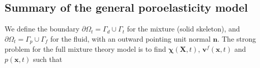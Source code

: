 \subsection{Summary of the general poroelasticity model}
We define the boundary $\partial\Omega_{t} = \Gamma_{d}  \cup \Gamma_{t} $ for the mixture (solid skeleton), and $\partial\Omega_{t} = \Gamma_{p}  \cup \Gamma_{f} $ for the fluid, with an outward pointing unit normal $\boldsymbol{n}$. The strong problem for the full mixture theory model is to find $\boldsymbol{\chi}(\boldsymbol{X},t)$,  $\boldsymbol{v}^{f}(\boldsymbol{x},t)$ and $p(\boldsymbol{x},t)$ such that
\begin{comment}
\begin{subequations}
\begin{align}
\hat\rho^{s} \boldsymbol{a}^{s}+\hat \rho^{f} \boldsymbol{a}^{f} = \nabla \cdot( \boldsymbol{\sigma}_{e}+\boldsymbol{\sigma}_{vis}-p\boldsymbol{I}) + \rho\boldsymbol{f} \;\;\; \mbox{in} \; \Omega_{t},\\
\hat\rho^{f}\boldsymbol{a}^{f}+  \boldsymbol{v}^{f}\left(  \frac{d^{f}\hat{\rho}^{f}  }{dt}  + \hat{\rho}^{f}  \nabla \cdot \boldsymbol{v}^{f} \right)=\nabla \cdot( \boldsymbol{\sigma}_{vis}^{f}- \phi p \boldsymbol{I}) + p \nabla \phi - \phi \boldsymbol{\kappa}^{-1}(\boldsymbol{v}^{f}-\boldsymbol{v}^{s}) + \hat\rho^{f}\boldsymbol{f}  \;\;\; \mbox{in} \; \Omega_{t}, \\
\nabla \cdot((1-\phi) \boldsymbol{v}^{s}) + \nabla \cdot (\phi \boldsymbol{v}^f)=g \;\;\;\;\;\mbox{in}\;\Omega_{t},
\\
\boldsymbol{\chi} =\boldsymbol{X}+\boldsymbol{u}_{D}   \;\;\; \mbox{on}\; \Gamma_{d},
\\
(\boldsymbol{\sigma}_{e}+\boldsymbol{\sigma}_{vis}-p\boldsymbol{I})\boldsymbol{n} = \boldsymbol{t}_{N}   \;\;\; \mbox{on}\; \Gamma_{t},
\\
\boldsymbol{v}^{f}   = \boldsymbol{v}^{f}_{D}  \;\;\; \mbox{on}\; \Gamma_{f},
\\
\mu_{f} \phi \frac{\partial \boldsymbol{v}^{f}}{\partial \boldsymbol{n}}- \phi p\boldsymbol{n}=\hat{\boldsymbol{s}}  \;\;\; \mbox{on}\; \Gamma_{p},
\\
\boldsymbol{\chi}(0) = \boldsymbol{X} + \boldsymbol{u}^{0},  \;\;\; \boldsymbol{v}^{s}(0) = {\boldsymbol{v}^{s0}},  \;\;\;\boldsymbol{v}^{f}(0) = {\boldsymbol{v}^{f0}} \;\;\;  \mbox{in}\;\Omega_{0}.
\end{align}
\label{eqn:full_mixture_model}
\end{subequations}
\end{comment}
